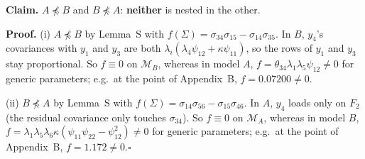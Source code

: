 \documentclass[10pt,a4paper]{article}
\newcommand{\nnest}{\not\preceq}
\begin{document}
\noindent\textbf{Claim.} $A \nnest B$ and $B \nnest A$: \textbf{neither} is nested in the other.\par\smallskip
\noindent\textbf{Proof.} (i) $A\nnest B$ by Lemma~S with $f(\Sigma)=\sigma_{34}\sigma_{15} - \sigma_{14}\sigma_{35}$. In $B$, $y_4$'s covariances with $y_1$ and $y_3$ are both $\lambda_i(\lambda_4\psi_{12}+\kappa\psi_{11})$, so the rows of $y_1$ and $y_3$ stay proportional. So $f\equiv0$ on $\mathcal M_B$, whereas in model $A$, $f=\theta_{34}\lambda_1\lambda_5\psi_{12}\neq0$ for generic parameters; e.g.\ at the point of Appendix~B, $f=0.07200\neq0$.\par\smallskip
\noindent(ii) $B\nnest A$ by Lemma~S with $f(\Sigma)=\sigma_{14}\sigma_{56} - \sigma_{15}\sigma_{46}$. In $A$, $y_4$ loads only on $F_2$ (the residual covariance only touches $\sigma_{34}$). So $f\equiv0$ on $\mathcal M_A$, whereas in model $B$, $f=\lambda_1\lambda_5\lambda_6\kappa(\psi_{11}\psi_{22}-\psi_{12}^2)\neq0$ for generic parameters; e.g.\ at the point of Appendix~B, $f=1.172\neq0$.\hfill$\square$\par\medskip
{}

\clearpage
\end{document}
